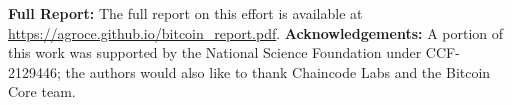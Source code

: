 
{\bf {Full Report:}} The full report on this effort is available at \url{https://agroce.github.io/bitcoin_report.pdf}.
{\small {\bf {Acknowledgements:}}  A portion of this work was supported by the National Science Foundation under CCF-2129446; the authors would also like to thank Chaincode Labs and the Bitcoin Core team.}
